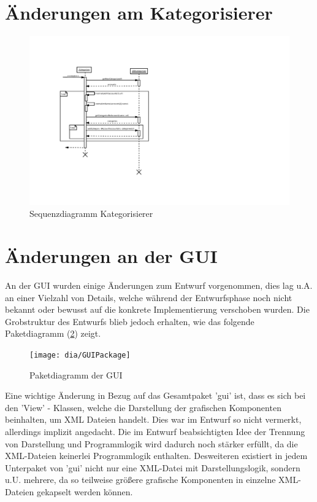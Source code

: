 \section{Änderungen am Kategorisierer}
\begin{figure}[h!]
	\centering
	\includegraphics[width=\textwidth,height=\textheight,keepaspectratio=true]{dia/categorizerSequence}
	\caption{Sequenzdiagramm Kategorisierer}
	\label{fig:Kategorisierer}
\end{figure}

\section{Änderungen an der GUI}
 An der GUI wurden einige Änderungen zum Entwurf vorgenommen, dies lag u.A. an einer Vielzahl von Details, welche während der Entwurfsphase noch nicht bekannt oder bewusst auf die konkrete Implementierung verschoben wurden. 
Die Grobstruktur des Entwurfs blieb jedoch erhalten, wie das folgende Paketdiagramm (\ref{fig:GUI}) zeigt.
\begin{figure}[h!]
	\centering
	\texttt{[image: dia/GUIPackage]}
	\caption{Paketdiagramm der GUI}
	\label{fig:GUI}
\end{figure}
	Eine wichtige Änderung in Bezug auf das Gesamtpaket 'gui' ist, dass es sich bei den 'View' - Klassen, welche die Darstellung der grafischen Komponenten beinhalten, um XML Dateien handelt. Dies war im Entwurf so nicht vermerkt, allerdings implizit angedacht. Die  im Entwurf beabsichtigten Idee der Trennung von Darstellung und Programmlogik wird dadurch noch stärker erfüllt, da die XML-Dateien keinerlei Programmlogik enthalten. Desweiteren existiert in jedem Unterpaket von 'gui' nicht nur eine XML-Datei mit Darstellungslogik, sondern u.U. mehrere, da so teilweise größere grafische Komponenten in einzelne XML-Dateien gekapselt werden können.
	
